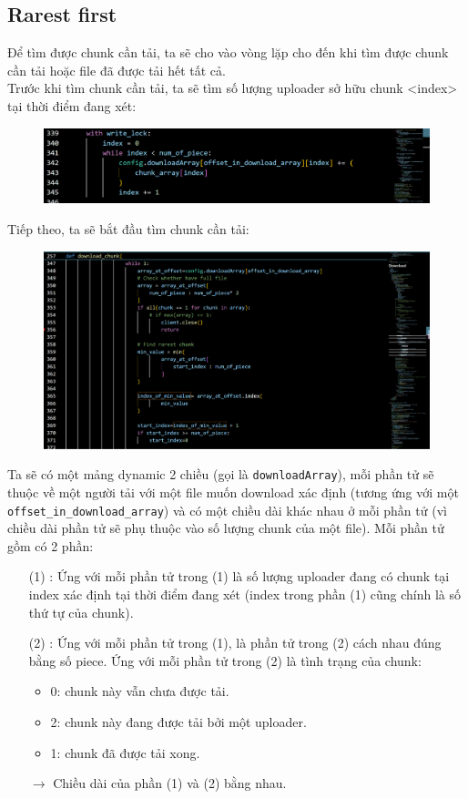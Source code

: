 \documentclass[a4paper]{article}
\begin{document}
\subsection{Rarest first}
Để tìm được chunk cần tải, ta sẽ cho vào vòng lặp cho đến khi tìm được chunk cần tải hoặc file đã được tải hết tất cả. \\
Trước khi tìm chunk cần tải, ta sẽ tìm số lượng uploader sở hữu chunk <index> tại thời điểm đang xét:
\begin{figure}[H]
    \centering
    \includegraphics[width=1\textwidth]{images/1.png}
    \captionsetup{labelformat=empty}
\end{figure}
Tiếp theo, ta sẽ bắt đầu tìm chunk cần tải:
\begin{figure}[H]
    \centering
    \includegraphics[width=1\textwidth]{images/2.png}
    \captionsetup{labelformat=empty}
\end{figure}
Ta sẽ có một mảng dynamic 2 chiều (gọi là \texttt{downloadArray}), mỗi phần tử sẽ thuộc về một người tải với một file muốn download xác định (tương ứng với một \texttt{offset\_in\_download\_array}) và có một chiều dài khác nhau ở mỗi phần tử (vì chiều dài phần tử sẽ phụ thuộc vào số lượng chunk của một file). Mỗi phần tử gồm có 2 phần: 

\begin{itemize}
    \item [(1)]:  Ứng với mỗi phần tử trong (1) là số lượng uploader đang có chunk tại index xác định tại thời điểm đang xét (index trong phần (1) cũng chính là số thứ tự của chunk).
    \item [(2)]:  Ứng với mỗi phần tử trong (1), là phần tử trong (2) cách nhau đúng bằng số piece. Ứng với mỗi phần tử trong (2) là tình trạng của chunk:
    \begin{itemize}
        \item 0: chunk này vẫn chưa được tải.
        \item 2: chunk này đang được tải bởi một uploader.
        \item 1: chunk đã được tải xong.
    \end{itemize}
    \item[$\rightarrow$] Chiều dài của phần (1) và (2) bằng nhau.
\end{itemize}
\end{document}
